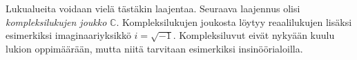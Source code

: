Lukualueita voidaan vielä tästäkin laajentaa. Seuraava laajennus olisi \emph{kompleksilukujen joukko} $\mathbb{C}$. Kompleksilukujen joukosta löytyy reaalilukujen lisäksi
esimerkiksi imaginaariyksikkö $i = \sqrt{-1}$.
Kompleksiluvut eivät nykyään kuulu lukion oppimäärään, mutta
niitä tarvitaan esimerkiksi insinöörialoilla.